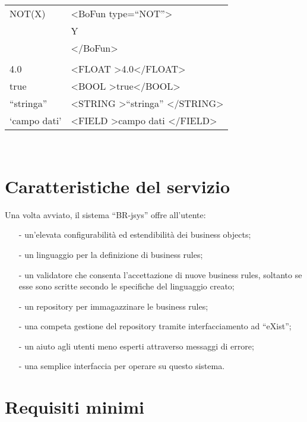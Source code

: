 \begin{table}[htbp]
\begin{tabular}{||p{3cm}||p{6.5cm}||}
\hline
NOT(X) & \textless BoFun type=``NOT''\textgreater \\
&  Y \\
& \textless /BoFun\textgreater \\ \hline
& \\ \hline 
4.0 & \textless FLOAT \textgreater4.0\textless /FLOAT\textgreater \\ \hline
true & \textless BOOL \textgreater true\textless /BOOL\textgreater \\ \hline
``stringa'' & \textless STRING \textgreater ``stringa'' \textless /STRING\textgreater \\ \hline
`campo dati' &\textless FIELD \textgreater campo dati \textless /FIELD\textgreater \\ \hline
\end{tabular} \\
\end{table}

\section{Caratteristiche del servizio}
Una volta avviato, il sistema ``BR-jsys'' offre all'utente:
\begin{itemize}
\item[-] un'elevata configurabilit\`a ed estendibilit\`a dei business objects;
\item[-] un linguaggio per la definizione di business rules;
\item[-] un validatore che consenta l'accettazione di nuove business rules, soltanto se esse sono scritte secondo le specifiche del linguaggio creato;
\item[-] un repository per immagazzinare le business rules;
\item[-] una competa gestione del repository tramite interfacciamento ad ``eXist'';
\item[-] un aiuto agli utenti meno esperti attraverso  messaggi di errore;
\item[-] una semplice interfaccia per operare su questo sistema.
\end{itemize}
\section{Requisiti minimi}
